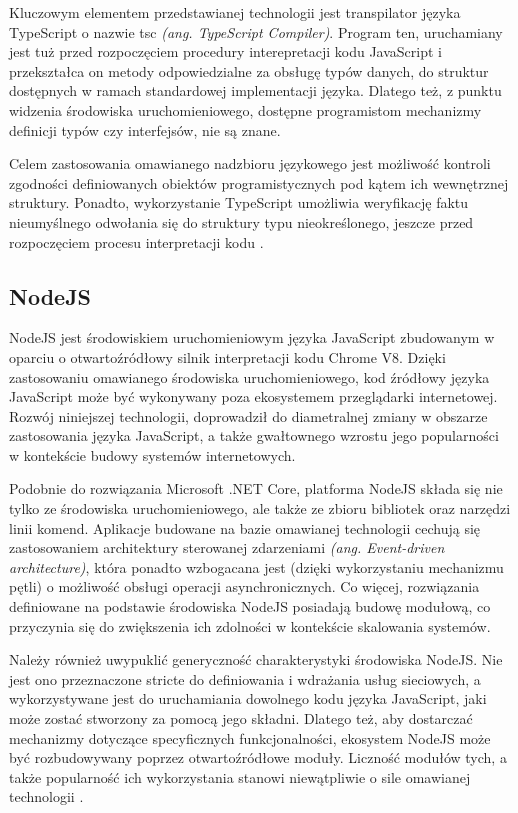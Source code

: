 Kluczowym elementem przedstawianej technologii jest transpilator języka TypeScript o nazwie tsc \textit{(ang. TypeScript Compiler)}. Program ten, uruchamiany jest tuż przed rozpoczęciem procedury interepretacji kodu JavaScript i przekształca on metody odpowiedzialne za obsługę typów danych, do struktur dostępnych w ramach standardowej implementacji języka. Dlatego też, z punktu widzenia środowiska uruchomieniowego, dostępne programistom mechanizmy definicji typów czy interfejsów, nie są znane.

Celem zastosowania omawianego nadzbioru językowego jest możliwość kontroli zgodności definiowanych obiektów programistycznych pod kątem ich wewnętrznej struktury. Ponadto, wykorzystanie TypeScript umożliwia weryfikację faktu nieumyślnego odwołania się do struktury typu nieokreślonego, jeszcze przed rozpoczęciem procesu interpretacji kodu \cite{bierman2014understanding}.
\subsection*{NodeJS}
NodeJS jest środowiskiem uruchomieniowym języka JavaScript zbudowanym w oparciu o otwartoźródłowy silnik interpretacji kodu Chrome V8. Dzięki zastosowaniu omawianego środowiska uruchomieniowego, kod źródłowy języka JavaScript może być wykonywany poza ekosystemem przeglądarki internetowej. Rozwój niniejszej technologii, doprowadził do diametralnej zmiany w obszarze zastosowania języka JavaScript, a także gwałtownego wzrostu jego popularności w kontekście budowy systemów internetowych.

Podobnie do rozwiązania Microsoft .NET Core, platforma NodeJS składa się nie tylko ze środowiska uruchomieniowego, ale także ze zbioru bibliotek oraz narzędzi linii komend. Aplikacje budowane na bazie omawianej technologii cechują się zastosowaniem architektury sterowanej zdarzeniami \textit{(ang. Event-driven architecture)}, która ponadto wzbogacana jest (dzięki wykorzystaniu mechanizmu pętli) o możliwość obsługi operacji asynchronicznych. Co więcej, rozwiązania definiowane na podstawie środowiska NodeJS posiadają budowę modułową, co przyczynia się do zwiększenia ich zdolności w kontekście skalowania systemów.

Należy również uwypuklić generyczność charakterystyki środowiska NodeJS. Nie jest ono przeznaczone stricte do definiowania i wdrażania usług sieciowych, a wykorzystywane jest do uruchamiania dowolnego kodu języka JavaScript, jaki może zostać stworzony za pomocą jego składni. Dlatego też, aby dostarczać mechanizmy dotyczące specyficznych funkcjonalności, ekosystem NodeJS może być rozbudowywany poprzez otwartoźródłowe moduły. Liczność modułów tych, a także popularność ich wykorzystania stanowi niewątpliwie o sile omawianej technologii \cite{casciaro2020node}.
